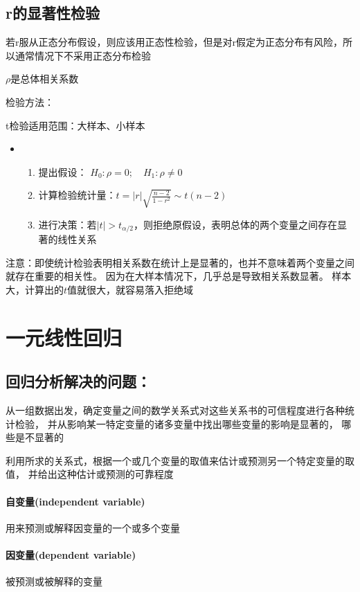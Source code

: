 \documentclass[UTF8,10pt]{book}
\begin{document}
{\subsection{r的显著性检验}	
若r服从正态分布假设，则应该用正态性检验，但是对r假定为正态分布有风险，所以通常情况下不采用正态分布检验 

$\rho$是总体相关系数 

检验方法：

t检验适用范围：大样本、小样本

\begin{itemize}
	\item [] {
		\begin{enumerate}
			\item 提出假设： $H_0:\rho=0; \quad H_1:\rho\neq 0$
			\item 计算检验统计量：$ t = |r| \sqrt{ \frac{n-2}{1-r^2} } \sim t(n-2) $
			\item 进行决策：若$|t|>t_{\alpha / 2}$，则拒绝原假设，表明总体的两个变量之间存在显著的线性关系 
			
		\end{enumerate}
	}
\end{itemize}

注意：即使统计检验表明相关系数在统计上是显著的，也并不意味着两个变量之间就存在重要的相关性。
因为在大样本情况下，几乎总是导致相关系数显著。 样本大，计算出的$t$值就很大，就容易落入拒绝域

\section{一元线性回归}
\subsection{回归分析解决的问题：}	
从一组数据出发，确定变量之间的数学关系式对这些关系书的可信程度进行各种统计检验，
并从影响某一特定变量的诸多变量中找出哪些变量的影响是显著的，
哪些是不显著的

利用所求的关系式，根据一个或几个变量的取值来估计或预测另一个特定变量的取值，
并给出这种估计或预测的可靠程度

\paragraph{自变量(independent variable)	}用来预测或解释因变量的一个或多个变量
\paragraph{因变量(dependent variable)	}被预测或被解释的变量
}
\end{document}

